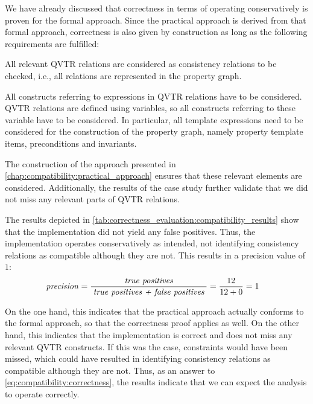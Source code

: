 We have already discussed that correctness in terms of operating conservatively is proven for the formal approach.
Since the practical approach is derived from that formal approach, correctness is also given by construction as long as the following requirements are fulfilled:
\begin{longenumerate}
    \item All relevant \gls{QVTR} relations are considered as consistency relations to be checked, i.e., all relations are represented in the property graph.
    \item All constructs referring to expressions in \gls{QVTR} relations have to be considered. \gls{QVTR} relations are defined using variables, so all constructs referring to these variable have to be considered. In particular, all template expressions need to be considered for the construction of the property graph, namely property template items, preconditions and invariants.
\end{longenumerate}
The construction of the approach presented in \autoref{chap:compatibility:practical_approach} ensures that these relevant elements are considered.
Additionally, the results of the case study further validate that we did not miss any relevant parts of \gls{QVTR} relations.

The results depicted in \autoref{tab:correctness_evaluation:compatibility_results} show that the implementation did not yield any false positives.
Thus, the implementation operates conservatively as intended, not identifying consistency relations as compatible although they are not.
This results in a precision value of $1$:
\begin{align*}
    &
    \mathit{precision} = \frac{\; \textit{true positives} \;}{\; \textit{true positives + false positives} \;} = \frac{12}{12+0} = 1
\end{align*}

On the one hand, this indicates that the practical approach actually conforms to the formal approach, so that the correctness proof applies as well.
On the other hand, this indicates that the implementation is correct and does not miss any relevant \gls{QVTR} constructs.
If this was the case, constraints would have been missed, which could have resulted in identifying consistency relations as compatible although they are not.
Thus, as an answer to \autoref{eq:compatibility:correctness}, the results indicate that we can expect the analysis to operate correctly.


